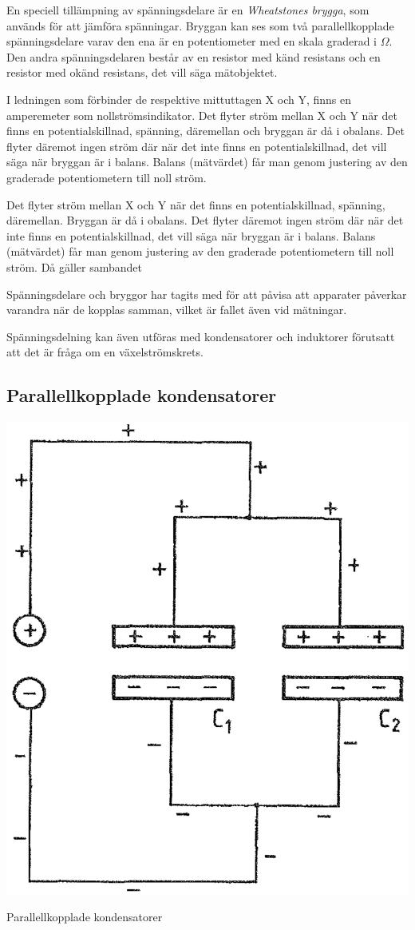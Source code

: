 En speciell tillämpning av spänningsdelare är en \emph{Wheatstones brygga},
som används för att jämföra spänningar.
Bryggan kan ses som två parallellkopplade spänningsdelare varav den ena är en
potentiometer med en skala graderad i \(\Omega\).
Den andra spänningsdelaren består av en resistor med känd resistans och en
resistor med okänd resistans, det vill säga mätobjektet.

I ledningen som förbinder de respektive mittuttagen X och Y, finns en
amperemeter som nollströmsindikator.
Det flyter ström mellan X och Y när det finns en potentialskillnad,
spänning, däremellan och bryggan är då i obalans.
Det flyter däremot ingen ström där när det inte finns en
potentialskillnad, det vill säga när bryggan är i balans.
Balans (mätvärdet) får man genom justering av den graderade
potentiometern till noll ström.

Det flyter ström mellan X och Y när det finns en potentialskillnad, spänning, däremellan.
Bryggan är då i obalans.
Det flyter däremot ingen ström där när det inte finns en potentialskillnad,
det vill säga när bryggan är i balans.
Balans (mätvärdet) får man genom justering av den graderade potentiometern
till noll ström.
Då gäller sambandet

Spänningsdelare och bryggor har tagits med för att påvisa att apparater påverkar
varandra när de kopplas samman, vilket är fallet även vid mätningar.

Spänningsdelning kan även utföras med kondensatorer och induktorer förutsatt att
det är fråga om en växelströmskrets.

\subsection{Parallellkopplade kondensatorer}

\begin{marginfigure}%
  \includegraphics[width=.7\textwidth]{images/cropped_pdfs/bild_2_3-05.pdf}
  \caption{Parallellkopplade kondensatorer}
  \label{fig:BildII3-05}
\end{marginfigure}

